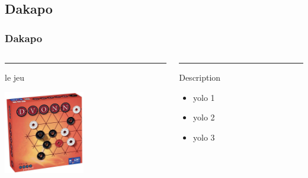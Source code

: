 \documentclass[11pt]{beamer}
\begin{document}
  \subsection[Dakapo]{Dakapo}
\begin{frame}
\frametitle{Dakapo}

\begin{columns}[T] %
\begin{column}{.35\textwidth}
\color{red}\rule{\linewidth}{4pt}
 le jeu

\begin{center}
\includegraphics[width=100pt]{images/dvon.jpg}
\end{center}
\end{column}%

\hfill%
\begin{column}{.62\textwidth}
\color{blue}\rule{\linewidth}{4pt}
Description
\begin{itemize}
\item yolo 1
\item yolo 2
\item yolo 3
\end{itemize}
\end{column}%
\end{columns}

\end{frame}
\end{document}
